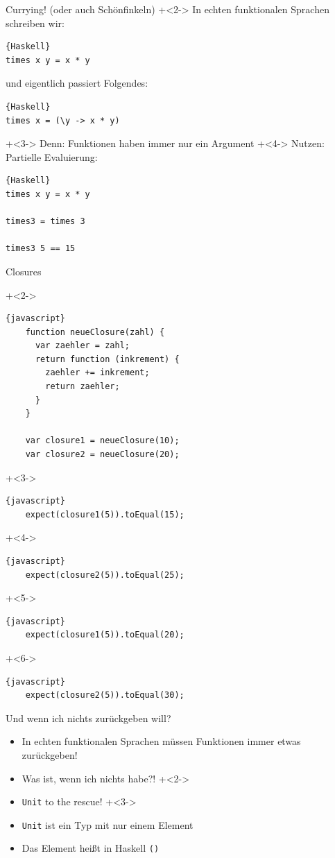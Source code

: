 \begin{frame}[fragile]{Currying! (oder auch Schönfinkeln)}
\onslide+<2->
In echten funktionalen Sprachen schreiben wir:
\begin{lstlisting}{Haskell}
times x y = x * y
\end{lstlisting}

und eigentlich passiert Folgendes:
\begin{lstlisting}{Haskell}
times x = (\y -> x * y)
\end{lstlisting}

\onslide+<3->
Denn: Funktionen haben immer nur ein Argument
\vfill
\onslide+<4->
Nutzen: Partielle Evaluierung:
\begin{lstlisting}{Haskell}
times x y = x * y

times3 = times 3

times3 5 == 15
\end{lstlisting}


\end{frame}

\begin{frame}[fragile]{Closures}

\onslide+<2->
\begin{lstlisting}{javascript}
    function neueClosure(zahl) {
      var zaehler = zahl;
      return function (inkrement) {
        zaehler += inkrement;
        return zaehler;
      }
    }

    var closure1 = neueClosure(10);
    var closure2 = neueClosure(20);
\end{lstlisting}
\onslide+<3->
\begin{lstlisting}{javascript}
    expect(closure1(5)).toEqual(15);
\end{lstlisting}
\onslide+<4->
\begin{lstlisting}{javascript}
    expect(closure2(5)).toEqual(25);
\end{lstlisting}
\onslide+<5->
\begin{lstlisting}{javascript}
    expect(closure1(5)).toEqual(20);
\end{lstlisting}
\onslide+<6->
\begin{lstlisting}{javascript}
    expect(closure2(5)).toEqual(30);
\end{lstlisting}

\end{frame}

\begin{frame}[fragile]{Und wenn ich nichts zurückgeben will?}
\begin{itemize}
\item In echten funktionalen Sprachen müssen Funktionen immer etwas zurückgeben!
\item Was ist, wenn ich nichts habe?!
\onslide+<2->
\item \texttt{Unit} to the rescue!
\onslide+<3->
\item \texttt{Unit} ist ein Typ mit nur einem Element
\item Das Element heißt in Haskell \texttt{()}
\end{itemize}
\end{frame}

